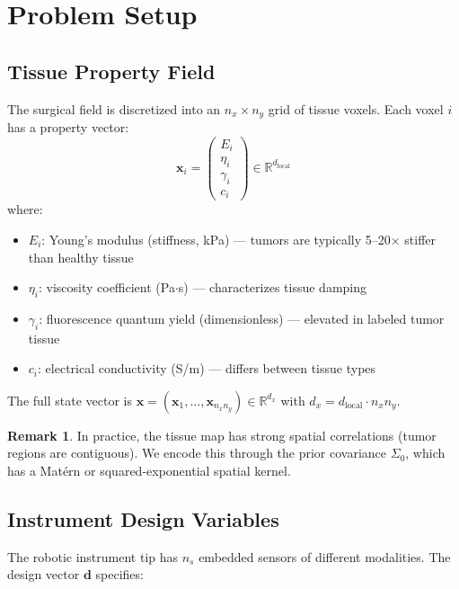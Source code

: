 \documentclass[11pt,a4paper]{article}
\newcommand{\R}{\mathbb{R}}
\theoremstyle{definition}
\newtheorem{remark}{Remark}
\begin{document}
\section{Problem Setup}

\subsection{Tissue Property Field}

The surgical field is discretized into an $n_x \times n_y$ grid of tissue voxels.  Each voxel $i$ has a property vector:
\[
  \bm{x}_i = \begin{pmatrix} E_i \\ \eta_i \\ \gamma_i \\ c_i \end{pmatrix} \in \R^{d_{\text{local}}}
\]
where:
\begin{itemize}[nosep]
  \item $E_i$: Young's modulus (stiffness, kPa) --- tumors are typically 5--20$\times$ stiffer than healthy tissue
  \item $\eta_i$: viscosity coefficient (Pa$\cdot$s) --- characterizes tissue damping
  \item $\gamma_i$: fluorescence quantum yield (dimensionless) --- elevated in labeled tumor tissue
  \item $c_i$: electrical conductivity (S/m) --- differs between tissue types
\end{itemize}

The full state vector is $\bm{x} = (\bm{x}_1, \ldots, \bm{x}_{n_x n_y}) \in \R^{d_x}$ with $d_x = d_{\text{local}} \cdot n_x n_y$.

\begin{remark}
In practice, the tissue map has strong spatial correlations (tumor regions are contiguous).  We encode this through the prior covariance $\Sigma_0$, which has a Mat\'{e}rn or squared-exponential spatial kernel.
\end{remark}

\subsection{Instrument Design Variables}

The robotic instrument tip has $n_s$ embedded sensors of different modalities.  The design vector $\bm{d}$ specifies:
\end{document}
